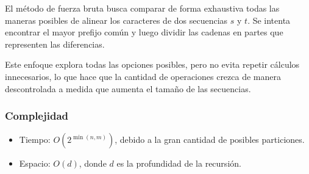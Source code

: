 El método de fuerza bruta busca comparar de forma exhaustiva todas las maneras posibles de alinear los caracteres de dos secuencias $s$ y $t$. Se intenta encontrar el mayor prefijo común y luego dividir las cadenas en partes que representen las diferencias.

Este enfoque explora todas las opciones posibles, pero no evita repetir cálculos innecesarios, lo que hace que la cantidad de operaciones crezca de manera descontrolada a medida que aumenta el tamaño de las secuencias.

\subsubsection{Complejidad}

\begin{itemize}
    \item Tiempo: $O(2^{\min(n,m)})$, debido a la gran cantidad de posibles particiones.
    \item Espacio: $O(d)$, donde $d$ es la profundidad de la recursión.
\end{itemize}


